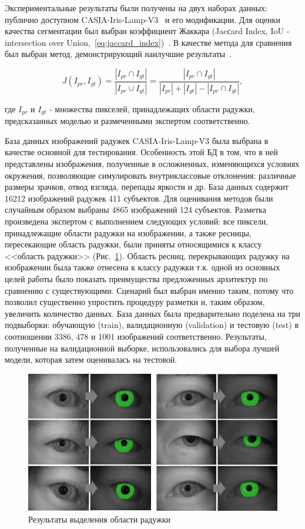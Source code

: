 Экспериментальные результаты были получены на двух наборах данных: публично доступном CASIA-Iris-Lamp-V3~\cite{casia_v3_lamp} и его модификации. Для оценки качества сегментации был выбран коэффициент Жаккара (Jacсard Index, IoU - intersection over Union,~\ref{eq:jaccard_index})~\cite{shelhamer_2017}. В качестве метода для сравнения был выбран метод, демонстрирующий наилучшие результаты~\cite{liu_2016}.

\begin{equation}
\label{eq:jaccard_index}
J(I_{pr},I_{gt}) = \frac{|I_{pr} \cap I_{gt}|}{|I_{pr} \cup I_{gt}| } = \frac{|I_{pr} \cap I_{gt}|}{|I_{pr}|+|I_{gt}|-|I_{pr} \cap I_{gt}|},
\end{equation}

\noindent
где $I_{pr}$ и $I_{gt}$  - множества пикселей, принадлежащих области радужки, предсказанных моделью и размеченными экспертом соответственно.

База данных изображений радужек CASIA-Iris-Lamp-V3 была выбрана в качестве основной для тестирования. Особенность этой БД в том, что в ней представлены изображения, полученные в осложненных, изменяющихся условиях окружения, позволяющие симулировать внутриклассовые отклонения: различные размеры зрачков, отвод взгляда, перепады яркости и др. База данных содержит 16212 изображений радужек 411 субъектов. Для оценивания методов были случайным образом выбраны 4865 изображений 124 субъектов. Разметка произведена экспертом с выполнением следующих условий: все пиксели, принадлежащие области радужки на изображении, а также ресницы, пересекающие область радужки, были приняты относящимися к классу <<область радужки>> (Рис.~\ref{fig:seg-results}). Область ресниц, перекрывающих радужку на изображении была также отнесена к классу радужки т.к. одной из основных целей работы было показать преимущества предложенных архитектур по сравнению с существующими. Сценарий был выбран именно таким, потому что позволил существенно упростить процедуру разметки и, таким образом, увеличить количество данных. База данных была предварительно поделена на три подвыборки: обучающую (train), валидационную (validation) и тестовую (test) в соотношении 3386, 478 и 1001 изображений соответственно. Результаты, полученные на валидационной выборке, использовались для выбора лучшей модели, которая затем оценивалась на тестовой.

\begin{figure}[t!]
	\centering
	\includegraphics[width=0.95\columnwidth]{pictures/seg-results.png}
	\caption{Результаты выделения области радужки}
	\label{fig:seg-results}
\end{figure}

